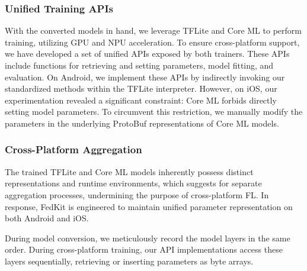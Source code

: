 \documentclass[letterpaper]{article} %
\begin{document}
\subsubsection{Unified Training APIs}
With the converted models in hand,
we leverage TFLite and Core ML to perform training,
utilizing GPU and NPU acceleration.
To ensure cross-platform support,
we have developed a set of unified APIs exposed by both trainers.
These APIs include functions for retrieving and setting parameters,
model fitting, and evaluation.
On Android, we implement these APIs by indirectly invoking
our standardized methods within the TFLite interpreter.
However, on iOS, our experimentation revealed a significant constraint:
Core ML forbids directly setting model parameters.
To circumvent this restriction,
we manually modify the parameters in the underlying ProtoBuf representations of
Core ML models.

\subsubsection{Cross-Platform Aggregation}
The trained TFLite and Core ML models inherently possess distinct
representations and runtime environments,
which suggests for separate aggregation processes,
undermining the purpose of cross-platform FL.
In response, FedKit is engineered to maintain unified parameter representation
on both Android and iOS.

During model conversion,
we meticulously record the model layers in the same order.
During cross-platform training,
our API implementations access these layers sequentially,
retrieving or inserting parameters as byte arrays.
\end{document}
